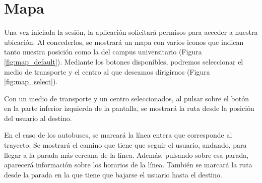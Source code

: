 \documentclass[a4paper,12pt]{report}
\begin{document}
\section{Mapa}
  Una vez iniciada la sesión, la aplicación solicitará permisos para acceder a nuestra ubicación. Al concederlos, se mostrará un mapa con varios iconos que indican tanto nuestra posición como la del campus universitario (Figura \ref{fig:map_default}). Mediante los botones disponibles, podremos seleccionar el medio de transporte y el centro al que deseamos dirigirnos (Figura \ref{fig:map_select}).

  Con un medio de transporte y un centro seleccionados, al pulsar sobre el botón en la parte inferior izquierda de la pantalla, se mostrará la ruta desde la posición del usuario al destino.
  
  En el caso de los autobuses, se marcará la línea entera que corresponde al trayecto. Se mostrará el camino que tiene que seguir el usuario, andando, para llegar a la parada más cercana de la línea. Además, pulsando sobre esa parada, aparecerá información sobre los horarios de la línea. También se marcará la ruta desde la parada en la que tiene que bajarse el usuario hasta el destino.

  
\end{document}
